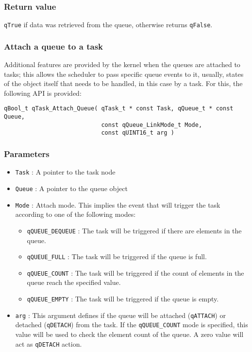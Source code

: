 \subsubsection*{Return value}
\lstinline{qTrue} if data was retrieved from the queue, otherwise returns \lstinline{qFalse}.

\subsubsection{Attach a queue to a task}
Additional features are provided by the kernel when the queues are attached to tasks; this allows the scheduler to pass specific queue events to it, usually, states of the object itself that needs to be handled, in this case by a task. For this, the following API is provided:  
\medskip
    
\begin{lstlisting}[style=CStyle]
qBool_t qTask_Attach_Queue( qTask_t * const Task, qQueue_t * const Queue,
                            const qQueue_LinkMode_t Mode, 
                            const qUINT16_t arg )
\end{lstlisting}
    
\subsubsection*{Parameters}
\begin{itemize}
    \item \lstinline{Task} : A pointer to the task node
    \item \lstinline{Queue} : A pointer to the queue object
    \item \lstinline{Mode} : Attach mode. This implies the event that will trigger the task according to one of the following modes:
    \begin{itemize}
        \item \lstinline{qQUEUE_DEQUEUE} : The task will be triggered if there are elements in the queue. 
        \item \lstinline{qQUEUE_FULL} :  The task will be triggered if the queue is full. 
        \item \lstinline{qQUEUE_COUNT} :  The task will be triggered if the count of elements in the queue reach the specified value. 
        \item \lstinline{qQUEUE_EMPTY} :  The task will be triggered if the queue is empty.
    \end{itemize}
    \item \lstinline{arg} : This argument defines if the queue will be attached (\lstinline{qATTACH}) or detached (\lstinline{qDETACH}) from the task. If the \lstinline{qQUEUE_COUNT} mode is specified, this value will be used to check the element count of the queue. A zero value will act as \lstinline{qDETACH} action. 
\end{itemize}  

